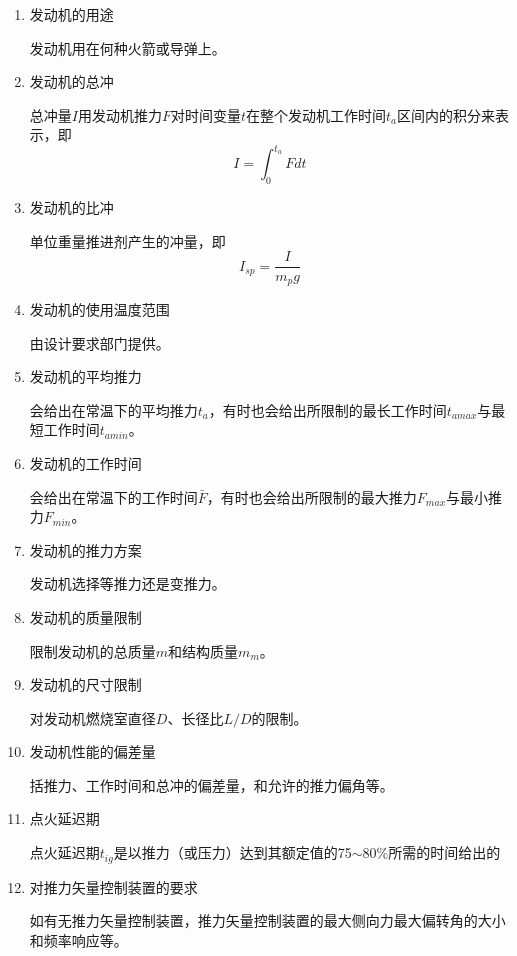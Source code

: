 \begin{enumerate}[leftmargin=2em]
  \item 发动机的用途
  
  发动机用在何种火箭或导弹上。
  \item 发动机的总冲
  
  总冲量$I$用发动机推力$F$对时间变量$t$在整个发动机工作时间$t_{a}$区间内的积分来表示，即
  \[
    I=\int_{0}^{t_{a}} Fdt
  \]

  \item 发动机的比冲
  
  单位重量推进剂产生的冲量，即
  \[
    I_{sp}=\frac{I}{m_{p}g} 
  \]

  \item 发动机的使用温度范围
  
  由设计要求部门提供。

  \item 发动机的平均推力
  
  会给出在常温下的平均推力$t_{a}$，有时也会给出所限制的最长工作时间$t_{amax}$与最短工作时间$t_{amin}$。

  \item 发动机的工作时间
  
  会给出在常温下的工作时间$\bar{F} $，有时也会给出所限制的最大推力$F_{max}$与最小推力$F_{min}$。

  \item 发动机的推力方案
  
  发动机选择等推力还是变推力。

  \item 发动机的质量限制
  
  限制发动机的总质量$m$和结构质量$m_{m}$。

  \item 发动机的尺寸限制
  
  对发动机燃烧室直径$D$、长径比$L/D$的限制。

  \item 发动机性能的偏差量
  
  括推力、工作时间和总冲的偏差量，和允许的推力偏角等。

  \item 点火延迟期
  
  点火延迟期$t_{ig}$是以推力（或压力）达到其额定值的75$\sim$80\%所需的时间给出的

  \item 对推力矢量控制装置的要求
  
  如有无推力矢量控制装置，推力矢量控制装置的最大侧向力最大偏转角的大小和频率响应等。


\end{enumerate}
